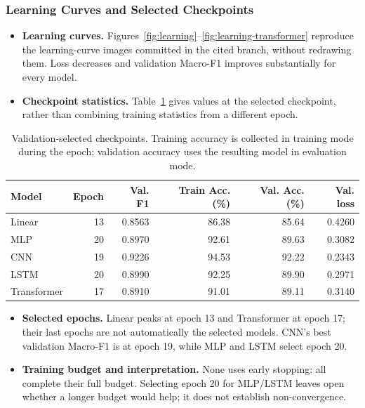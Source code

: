 \subsubsection{Learning Curves and Selected Checkpoints}
\begin{itemize}
\setlength{\itemsep}{3pt}
\setlength{\parskip}{0pt}
\item \textbf{Learning curves.} Figures~\ref{fig:learning}--\ref{fig:learning-transformer} reproduce the learning-curve images committed in the cited branch, without redrawing them. Loss decreases and validation Macro-F1 improves substantially for every model.
\item \textbf{Checkpoint statistics.} Table~\ref{tab:bestepochs} gives values at the selected checkpoint, rather than combining training statistics from a different epoch.
\end{itemize}
\begin{table}[!htbp]\centering\small
\caption{Validation-selected checkpoints. Training accuracy is collected in training mode during the epoch; validation accuracy uses the resulting model in evaluation mode.}
\label{tab:bestepochs}
\begin{tabular}{@{}lrrrrr@{}}\toprule
Model & Epoch & Val. F1 & Train Acc. (\%) & Val. Acc. (\%) & Val. loss\\\midrule
Linear & 13 & 0.8563 & 86.38 & 85.64 & 0.4260 \\
MLP & 20 & 0.8970 & 92.61 & 89.63 & 0.3082 \\
CNN & 19 & 0.9226 & 94.53 & 92.22 & 0.2343 \\
LSTM & 20 & 0.8990 & 92.25 & 89.90 & 0.2971 \\
Transformer & 17 & 0.8910 & 91.01 & 89.11 & 0.3140 \\
\bottomrule\end{tabular}\end{table}

\begin{itemize}
\setlength{\itemsep}{3pt}
\setlength{\parskip}{0pt}
\item \textbf{Selected epochs.} Linear peaks at epoch 13 and Transformer at epoch 17; their last epochs are not automatically the selected models. CNN's best validation Macro-F1 is at epoch 19, while MLP and LSTM select epoch 20.
\item \textbf{Training budget and interpretation.} None uses early stopping: all complete their full budget. Selecting epoch 20 for MLP/LSTM leaves open whether a longer budget would help; it does not establish non-convergence.
\end{itemize}

